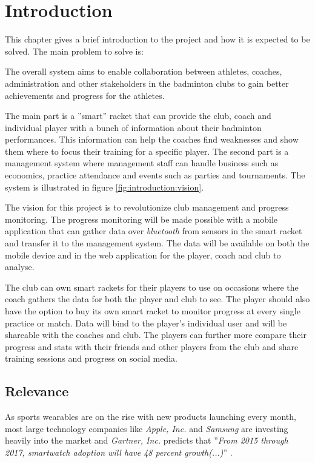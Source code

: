 \chapter{Introduction}
This chapter gives a brief introduction to the project and how it is expected to be solved.
The main problem to solve is:


The overall system aims to enable collaboration between athletes, coaches, administration and other stakeholders in the badminton clubs to gain better achievements and progress for the athletes.

The main part is a ''smart'' racket that can provide the club, coach and individual player with a bunch of information about their badminton performances.
This information can help the coaches find weaknesses and show them where to focus their training for a specific player.
The second part is a management system where management staff can handle business such as economics, practice attendance and events such as parties and tournaments.
The system is illustrated in figure \ref{fig:introduction:vision}.


The vision for this project is to revolutionize club management and progress monitoring.
The progress monitoring will be made possible with a mobile application that can gather data over \textit{\gls{bluetooth}} from sensors in the smart racket and transfer it to the management system.
The data will be available on both the mobile device and in the web application for the player, coach and club to analyse.

The club can own smart rackets for their players to use on occasions where the coach gathers the data for both the player and club to see.
The player should also have the option to buy its own smart racket to monitor progress at every single practice or match.
Data will bind to the player's individual user and will be shareable with the coaches and club.
The players can further more compare their progress and stats with their friends and other players from the club and share training sessions and progress on social media.

\section*{Relevance}
As sports wearables are on the rise with new products launching every month, most large technology companies like \textit{Apple, Inc.} and \textit{Samsung} are investing heavily into the market and \textit{Gartner, Inc.} predicts that ''\textit{From 2015 through 2017, smartwatch adoption will have 48 percent growth(...)}'' \citep{introduction:relevance:gartner}.

